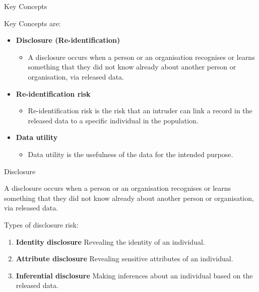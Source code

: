 \documentclass[
	aspectratio = 169
 ]{beamer}
\begin{document}
\begin{frame}{Key Concepts}

Key Concepts are:

\begin{itemize}
\tightlist
\item
  \textbf{Disclosure (Re-identification)}

  \begin{itemize}
  \tightlist
  \item
    A disclosure occurs when a person or an organisation recognises or
    learns something that they did not know already about another person
    or organisation, via released data.
  \end{itemize}
\end{itemize}

\pause

\begin{itemize}
\tightlist
\item
  \textbf{Re-identification risk}

  \begin{itemize}
  \tightlist
  \item
    Re-identification risk is the risk that an intruder can link a
    record in the released data to a specific individual in the
    population.
  \end{itemize}
\end{itemize}

\pause

\begin{itemize}
\tightlist
\item
  \textbf{Data utility}

  \begin{itemize}
  \tightlist
  \item
    Data utility is the usefulness of the data for the intended purpose.
  \end{itemize}
\end{itemize}

\end{frame}
\begin{frame}{Disclosure}

A disclosure occurs when a person or an organisation recognises or
learns something that they did not know already about another person or
organisation, via released data.

Types of disclosure risk:

\begin{enumerate}
[(1)]
\tightlist
\item
  \textbf{Identity disclosure} Revealing the identity of an individual.
  \vspace{0.5cm}
\item
  \textbf{Attribute disclosure} Revealing sensitive attributes of an
  individual. \vspace{0.5cm}
\item
  \textbf{Inferential disclosure} Making inferences about an individual
  based on the released data.
\end{enumerate}

\end{frame}
\end{document}
